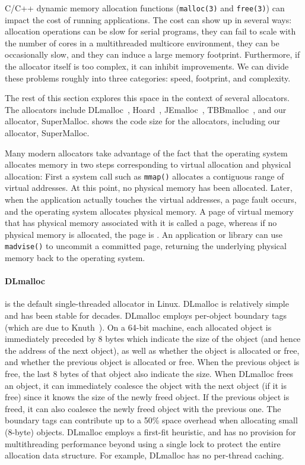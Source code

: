 \documentclass[natbib,sort&compress]{sigplanconf}
\newcommand{\code}[1]{\texttt{#1}}
\begin{document}
              


C/C++ dynamic memory allocation functions (\code{malloc(3)} and
\code{free(3)}) can impact the cost of running applications.  The cost
can show up in several ways: allocation operations can be slow for
serial programs, they can fail to scale with the number of cores in a
multithreaded multicore environment, they can be occasionally slow,
and they can induce a large memory footprint.  Furthermore, if the
allocator itself is too complex, it can inhibit improvements.  We can
divide these problems roughly into three categories: speed, footprint,
and complexity. 

The rest of this section explores this space in the context of several
allocators.  The allocators include DLmalloc~\cite{Lea96},
Hoard~\cite{BergerMcBl00}, JEmalloc~\cite{Evans06},
TBBmalloc~\cite{KukanovVo07}, and our allocator, SuperMalloc.
 shows the code size for the allocators, including
our allocator, SuperMalloc.

Many modern allocators take advantage of the fact that the operating
system allocates memory in two steps corresponding to virtual
allocation and physical allocation: First a system call such as
\code{mmap()} allocates a contiguous range of virtual addresses.  At
this point, no physical memory has been allocated.  Later, when the
application actually touches the virtual addresses, a page fault
occurs, and the operating system allocates physical memory.  A page of
virtual memory that has physical memory associated with it is called a
 page, whereas if no physical memory is allocated, the
page is .  An application or library can use
\code{madvise()} to uncommit a committed page, returning the
underlying physical memory back to the operating system.

{\paragraph{DLmalloc}} \cite{Lea96} is the default single-threaded
allocator in Linux.  DLmalloc is relatively simple and has been stable
for decades.  DLmalloc employs per-object boundary tags (which are due
to Knuth~\cite{Knuth73}).  On a 64-bit machine, each allocated object
is immediately preceded by 8 bytes which indicate the size of the
object (and hence the address of the next object), as well as whether
the object is allocated or free, and whether the previous object is
allocated or free.  When the previous object is free, the last 8 bytes
of that object also indicate the size.  When DLmalloc frees an object,
it can immediately coalesce the object with the next object (if it is
free) since it knows the size of the newly freed object.  If the
previous object is freed, it can also coalesce the newly freed object
with the previous one.  The boundary tags can contribute up to a 50\%
space overhead when allocating small (8-byte) objects.  DLmalloc
employs a first-fit heuristic, and has no provision for multithreading
performance beyond using a single lock to protect the entire
allocation data structure.  For example, DLmalloc has no per-thread
caching.
\end{document}
